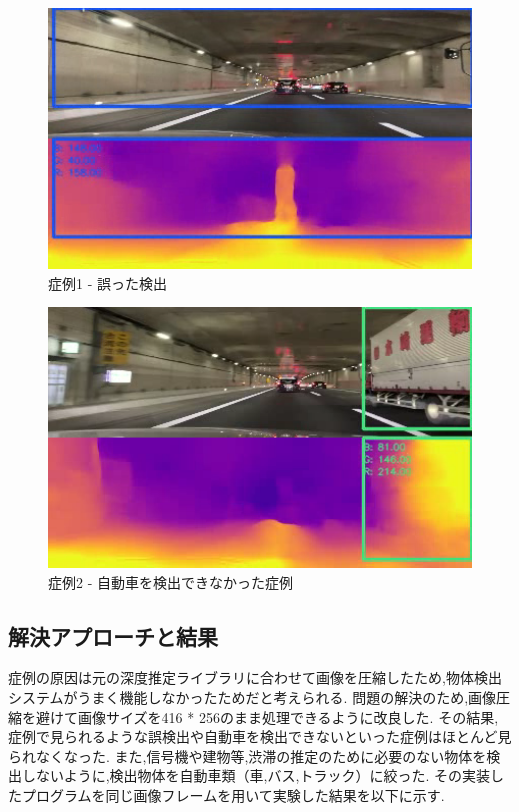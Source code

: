 \newpage
\begin{figure}[htbp]
  \begin{center}
   \includegraphics[width=12cm]{figs/miss_1.png}
  \end{center}
  \caption{症例1 - 誤った検出}
  \label{fig:miss1}
\end{figure}

\begin{figure}[hbtp]
 \begin{center}
  \includegraphics[width=12cm]{figs/miss_2.png}
 \end{center}
  \caption{症例2 - 自動車を検出できなかった症例}
  \label{fig:miss2}
\end{figure}


\subsection{解決アプローチと結果}
症例の原因は元の深度推定ライブラリに合わせて画像を圧縮したため,物体検出システムがうまく機能しなかったためだと考えられる.
問題の解決のため,画像圧縮を避けて画像サイズを416 * 256のまま処理できるように改良した.
その結果,症例で見られるような誤検出や自動車を検出できないといった症例はほとんど見られなくなった.
また,信号機や建物等,渋滞の推定のために必要のない物体を検出しないように,検出物体を自動車類（車,バス,トラック）に絞った.
その実装したプログラムを同じ画像フレームを用いて実験した結果を以下に示す.

